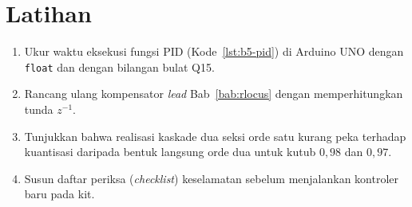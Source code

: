 \section*{Latihan}
\begin{enumerate}
	\item Ukur waktu eksekusi fungsi PID (Kode~\ref{lst:b5-pid}) di Arduino UNO dengan \texttt{float} dan dengan bilangan bulat Q15.
	\item Rancang ulang kompensator \textit{lead} Bab~\ref{bab:rlocus} dengan memperhitungkan tunda $z^{-1}$.
	\item Tunjukkan bahwa realisasi kaskade dua seksi orde satu kurang peka terhadap kuantisasi daripada bentuk langsung orde dua untuk kutub $0{,}98$ dan $0{,}97$.
	\item Susun daftar periksa (\textit{checklist}) keselamatan sebelum menjalankan kontroler baru pada kit.
\end{enumerate}
